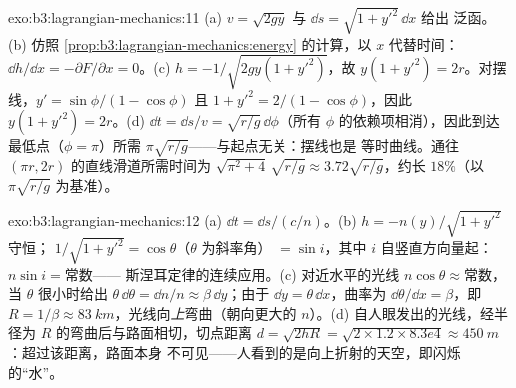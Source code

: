 \begin{solution}{exo:b3:lagrangian-mechanics:11}
(a) $v = \sqrt{2gy}$ 与 $\dd s = \sqrt{1 + y'^2}\,\dd x$ 给出
泛函。(b) 仿照
\cref{prop:b3:lagrangian-mechanics:energy} 的计算，以 $x$ 代替时间：$\dd
h/\dd x = -\partial F/\partial x = 0$。(c) $h = -1/\sqrt{2gy(1 +
y'^2)}$，故 $y(1 + y'^2) = 2r$。对摆线，$y' =
\sin\phi/(1 - \cos\phi)$ 且 $1 + y'^2 = 2/(1 - \cos\phi)$，因此
$y(1 + y'^2) = 2r$。(d) $\dd t = \dd s/v = \sqrt{r/g}\,\dd\phi$（所有
$\phi$ 的依赖项相消），因此到达最低点（$\phi = \pi$）所需
$\pi\sqrt{r/g}$——与起点无关：摆线也是
等时曲线。通往 $(\pi r, 2r)$ 的直线滑道所需时间为 $\sqrt{\pi^2
+ 4}\,\sqrt{r/g} \approx 3.72\sqrt{r/g}$，约长 $18\%$（以
$\pi\sqrt{r/g}$ 为基准）。
\end{solution}

\begin{solution}{exo:b3:lagrangian-mechanics:12}
(a) $\dd t = \dd s/(c/n)$。(b) $h = -n(y)/\sqrt{1 + y'^2}$ 守恒；
$1/\sqrt{1 + y'^2} = \cos\theta$（$\theta$ 为斜率角）
$= \sin i$，其中 $i$ 自竖直方向量起：$n\sin i = \text{常数}$——
斯涅耳定律的连续应用。(c) 对近水平的光线
$n\cos\theta \approx \text{常数}$，当 $\theta$ 很小时给出
$\theta\,\dd\theta = \dd n/n \approx \beta\,\dd y$；由于 $\dd y =
\theta\,\dd x$，曲率为 $\dd\theta/\dd x = \beta$，即 $R =
1/\beta \approx \qty{83}{km}$，光线向\emph{上}弯曲（朝向更大的
$n$）。(d) 自人眼发出的光线，经半径为
$R$ 的弯曲后与路面相切，切点距离 $d = \sqrt{2hR} = \sqrt{2 \times 1.2 \times
8.3e4} \approx \qty{450}{m}$：超过该距离，路面本身
不可见——人看到的是向上折射的天空，即闪烁的“水”。
\end{solution}

